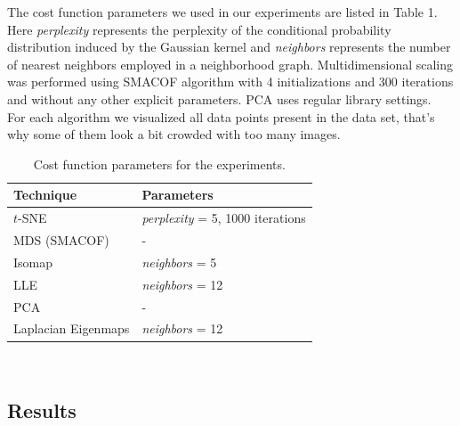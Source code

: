 The cost function parameters we used in our experiments are listed in Table 1. Here \textit{perplexity} represents the perplexity of the conditional probability distribution induced by the Gaussian kernel and \textit{neighbors} represents the number of nearest neighbors employed in a neighborhood graph. Multidimensional scaling was performed using SMACOF algorithm with 4 initializations and 300 iterations and without any other explicit parameters. PCA uses regular library settings.\\

For each algorithm we visualized all data points present in the data set, that's why some of them look a bit crowded with too many images. 

\begin{table}[H]
	\centering
	\begin{tabular}{| l | l |}
		\hline
		Technique & Parameters \\
		\hline			
		$t$-SNE & \textit{perplexity} = 5, 1000 iterations    \\
		MDS (SMACOF) & -  \\
		Isomap & \textit{neighbors} = 5  \\
		LLE & \textit{neighbors} = 12 \\
		PCA & - \\
		Laplacian Eigenmaps & \textit{neighbors} = 12 \\
		\hline  
	\end{tabular}\\
	\caption{Cost function parameters for the experiments.}
\end{table}

\subsection{Results}



